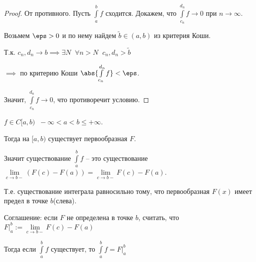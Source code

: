 \begin{proof}\slashns
	
	От противного. Пусть $\int\limits_a^b f$ сходится. Докажем, что $\int\limits_{c_n}^{d_n} f \to 0$ при $n \to \infty$.
	
	Возьмем $\eps > 0$ и по нему найдем $\tilde{b} \in (a,b)$ из критерия Коши.
	
	Т.к. $c_n, d_n \to b \implies \exists N \;\; \forall n > N \;\; c_n, d_n > \tilde{b}$
	
	$\implies$ по критерию Коши $\abs{\int\limits_{c_n}^{d_n} f} < \eps$.
	
	Значит, $\int\limits_{c_n}^{d_n} f \to 0$, что противоречит условию.
\end{proof}

\begin{remark}\slashns
	
	$f \in C[a,b) \;\; -\infty < a < b \le +\infty$.
	
	Тогда на $[a,b)$ существует первообразная $F$.
	
	Значит существование $\int\limits_a^b f$ -- это существование $\lim\limits_{c \to b-} (F(c) - F(a)) = \lim\limits_{c \to b-} F(c) - F(a)$.
	
	Т.е. существование интеграла равносильно тому, что первообразная $F(x)$ имеет предел в точке $b$(слева).
	
	Соглашение: если $F$ не определена в точке $b$, считать, что $F \Big|_a^b := \lim\limits_{c\to b-} F(c) - F(a)$
	
	Тогда если $\int\limits_a^b f$ существует, то $\int\limits_a^b f = F\Big|_a^b$
	
\end{remark}

